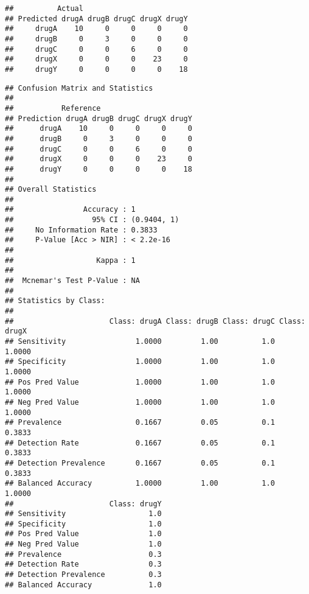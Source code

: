 \documentclass[
]{article}
\newenvironment{Shaded}{\begin{snugshade}}{\end{snugshade}}
\newcommand{\CommentTok}[1]{\textcolor[rgb]{0.56,0.35,0.01}{\textit{#1}}}
\newcommand{\FunctionTok}[1]{\textcolor[rgb]{0.13,0.29,0.53}{\textbf{#1}}}
\newcommand{\NormalTok}[1]{#1}
\newcommand{\OtherTok}[1]{\textcolor[rgb]{0.56,0.35,0.01}{#1}}
\newcommand{\SpecialCharTok}[1]{\textcolor[rgb]{0.81,0.36,0.00}{\textbf{#1}}}
\begin{document}
\begin{verbatim}
##          Actual
## Predicted drugA drugB drugC drugX drugY
##     drugA    10     0     0     0     0
##     drugB     0     3     0     0     0
##     drugC     0     0     6     0     0
##     drugX     0     0     0    23     0
##     drugY     0     0     0     0    18
\end{verbatim}

\begin{Shaded}
\end{Shaded}

\begin{verbatim}
## Confusion Matrix and Statistics
## 
##           Reference
## Prediction drugA drugB drugC drugX drugY
##      drugA    10     0     0     0     0
##      drugB     0     3     0     0     0
##      drugC     0     0     6     0     0
##      drugX     0     0     0    23     0
##      drugY     0     0     0     0    18
## 
## Overall Statistics
##                                      
##                Accuracy : 1          
##                  95% CI : (0.9404, 1)
##     No Information Rate : 0.3833     
##     P-Value [Acc > NIR] : < 2.2e-16  
##                                      
##                   Kappa : 1          
##                                      
##  Mcnemar's Test P-Value : NA         
## 
## Statistics by Class:
## 
##                      Class: drugA Class: drugB Class: drugC Class: drugX
## Sensitivity                1.0000         1.00          1.0       1.0000
## Specificity                1.0000         1.00          1.0       1.0000
## Pos Pred Value             1.0000         1.00          1.0       1.0000
## Neg Pred Value             1.0000         1.00          1.0       1.0000
## Prevalence                 0.1667         0.05          0.1       0.3833
## Detection Rate             0.1667         0.05          0.1       0.3833
## Detection Prevalence       0.1667         0.05          0.1       0.3833
## Balanced Accuracy          1.0000         1.00          1.0       1.0000
##                      Class: drugY
## Sensitivity                   1.0
## Specificity                   1.0
## Pos Pred Value                1.0
## Neg Pred Value                1.0
## Prevalence                    0.3
## Detection Rate                0.3
## Detection Prevalence          0.3
## Balanced Accuracy             1.0
\end{verbatim}
\end{document}

